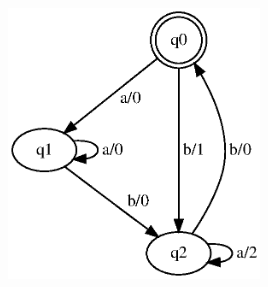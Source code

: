\begin{frame}
\begin{columns}[T]
\begin{column}{.70\textwidth}
\centering
\includegraphics[width=0.5\textwidth]{images/fsm-example01_orig}%
%
%

\end{column}
\end{columns}
\end{frame}
